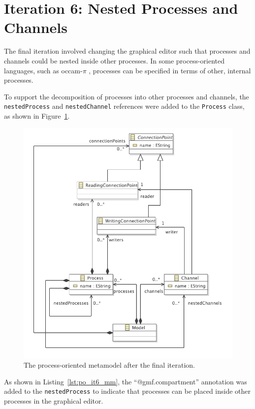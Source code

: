 \section{Iteration 6: Nested Processes and Channels}
The final iteration involved changing the graphical editor such that processes and channels could be nested inside other processes. In some process-oriented languages, such as occam-$\pi$ \cite{occam_pi}, processes can be specified in terms of other, internal processes.

To support the decomposition of processes into other processes and channels, the \texttt{ne\-st\-edPr\-oc\-e\-ss} and \texttt{ne\-st\-edCh\-an\-n\-el} references were added to the \texttt{Pr\-oc\-e\-ss} class, as shown in Figure~\ref{fig:po_it6_mm}. 

\begin{figure}[htbp]
	\centering
		\includegraphics[scale=0.75]{A.2.ProcessOriented/images/6_mm.pdf}
	\caption{The process-oriented metamodel after the final iteration.}
	\label{fig:po_it6_mm}
\end{figure}

As shown in Listing~\ref{lst:po_it6_mm}, the ``@gmf.compartment'' annotation was added to the \texttt{ne\-st\-edPr\-oc\-e\-ss} to indicate that processes can be placed inside other processes in the graphical editor.

